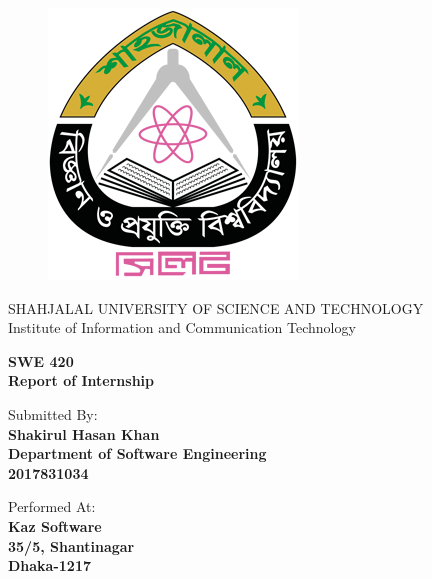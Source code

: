 \begin{titlepage}
\begin{figure}[!htb]
    \centering
    \includegraphics[keepaspectratio=true,scale=2]{images/Frontpage/sustlogo.png}
\end{figure}

\begin{center}
    \LARGE{SHAHJALAL UNIVERSITY OF SCIENCE AND TECHNOLOGY}
    \vspace{5mm}
    \\ \LARGE{Institute of Information and Communication Technology}
\end{center}

\vspace{15mm}
\begin{center}
    {\LARGE{\bf SWE 420\\ \vspace{5mm} Report of Internship }}
    
    
\end{center}
\vspace{30mm}

\begin{minipage}[t]{0.47\textwidth}
	{\large{Submitted By:}{\normalsize\vspace{3mm}
	\bf\\ \large{Shakirul Hasan Khan} \normalsize\vspace{2mm} \\ Department of Software Engineering \\ 2017831034}}
\end{minipage}
\hfill
\begin{minipage}[t]{0.47\textwidth}\raggedleft
	{\large{Performed At:}{\normalsize\vspace{3mm} \bf\\ \large{Kaz Software}\normalsize\vspace{2mm}\\ 35/5, Shantinagar \\ Dhaka-1217}}
\end{minipage}

\vspace{30mm}
\hrulefill
\\

\end{titlepage}
